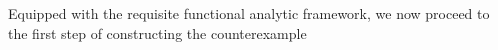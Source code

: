 \documentclass[preprint,12pt]{elsarticle}
\newtheorem*{remark}{Remark}
\newcommand{\R}{\mathbb R}
\newtheorem{definition}{Definition}
\begin{document}



Equipped with the requisite functional analytic framework, we now proceed to the first step of constructing the counterexample
\end{document}
